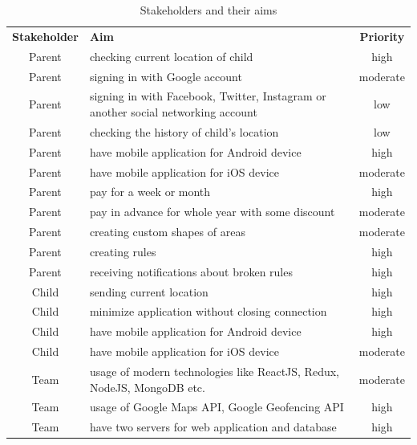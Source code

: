 \documentclass{sprawozdanie-agh}
\begin{document}
			\begin{table}[h]
				\begin{center}
					\begin{tabular}{|c|p{7cm}|c|}
						\cline{1-3}
						\textbf{Stakeholder} & \textbf{Aim} & \textbf{Priority} \\
						\cline{1-3}
						Parent & checking current location of child & high \\
						\cline{1-3}
						Parent & signing in with Google account & moderate \\
						\cline{1-3}
						Parent & signing in with Facebook, Twitter, Instagram or another social networking account & low \\
						\cline{1-3}
						Parent & checking the history of child's location & low \\
						\cline{1-3}
						Parent & have mobile application for Android device & high \\
						\cline{1-3}
						Parent & have mobile application for iOS device & moderate \\
						\cline{1-3}
						Parent & pay for a week or month & high \\
						\cline{1-3}
						Parent & pay in advance for whole year with some discount & moderate \\
						\cline{1-3}
						Parent & creating custom shapes of areas & moderate \\
						\cline{1-3}
						Parent & creating rules & high \\
						\cline{1-3}
						Parent & receiving notifications about broken rules & high \\
						\cline{1-3}
						Child & sending current location & high \\
						\cline{1-3}
						Child & minimize application without closing connection & high \\
						\cline{1-3}
						Child & have mobile application for Android device & high \\
						\cline{1-3}
						Child & have mobile application for iOS device & moderate \\
						\cline{1-3}
						Team & usage of modern technologies like ReactJS, Redux, NodeJS, MongoDB etc. & moderate \\
						\cline{1-3}
						Team & usage of Google Maps API, Google Geofencing API & high \\
						\cline{1-3}
						Team & have two servers for web application and database & high \\
						\cline{1-3}
					\end{tabular}
				\end{center}
				\caption{Stakeholders and their aims}
			\end{table}
\end{document}
